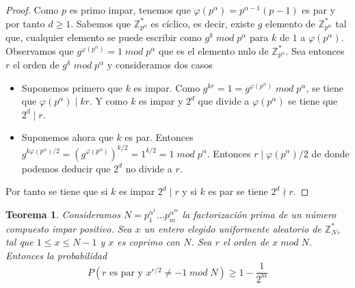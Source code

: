 \documentclass[a4paper]{article}
\newtheorem{teo}{Teorema}[section]
\numberwithin{equation}{section}
\newcommand{\modd}{\; mod \;}
\begin{document}
\begin{proof}
Como $p$ es primo impar, tenemos que $\varphi(p^\alpha) = p^{\alpha-1}(p-1)$ es par y por tanto $d\geq 1$. Sabemos que $\mathbb{Z}_{p^\alpha}^{*}$ es cíclico, es decir, existe $g$ elemento de $\mathbb{Z}_{p^\alpha}^{*}$ tal que, cualquier elemento se puede escribir como $g^k \modd p^\alpha$ para $k$ de $1$ a $\varphi(p^\alpha)$. Observamos que $g^{\varphi(p^\alpha)} = 1 \modd p^\alpha$ que es el elemento nulo de $\mathbb{Z}_{p^\alpha}^{*}$. Sea entonces $r$ el orden de $g^k \modd p^\alpha$ y consideramos dos casos
\begin{itemize}
\item Suponemos primero que $k$ es impar. Como $g^{kr} = 1 = g^{\varphi(p^\alpha)} \modd p^\alpha$, se tiene que $\varphi(p^\alpha)\mid kr$. Y como $k$ es impar y $2^d$ que divide a $\varphi(p^\alpha)$ se tiene que $2^d \mid r$.

\item Suponemos ahora que $k$ es par. Entonces $g^{k\varphi(p^\alpha)/2} = \left( g^{\varphi(p^\alpha)}\right)^{k/2} = 1^{k/2} = 1 \modd p^\alpha$. Entonces $r\mid \varphi(p^\alpha)/2$ de donde podemos deducir que $2^d$ no divide a $r$.
\end{itemize}
Por tanto se tiene que si $k$ es impar $2^d\mid r$ y si $k$ es par se tiene $2^d \nmid r$.
\end{proof}

\begin{teo}
Consideramos $N = p_{1}^{\alpha^1}\ldots p_{m}^{\alpha^m}$ la factorización prima de un número compuesto impar positivo. Sea $x$ un entero elegido uniformente aleatorio de $\mathbb{Z}_{N}^{*}$, tal que $1 \leq x \leq N-1$ y $x$ es coprimo con $N$. Sea $r$ el orden de $x \modd N$. Entonces la probabilidad
\begin{equation}
P(r \text{ es par y } x^{r/2} \neq -1 \modd N) \geq 1 - \frac{1}{2^m}
\end{equation}
\end{teo}
\end{document}
